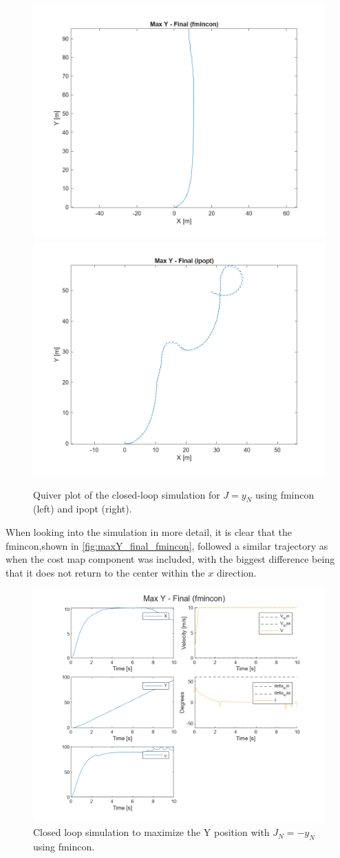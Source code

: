 \documentclass[]{IEEEtran}
\begin{document}
\begin{figure}[h]
    \centering
    \includegraphics[width = 0.49\columnwidth]{figs/Max_Y_-_Final_(fmincon)_quiver.png}
    \includegraphics[width = 0.49\columnwidth]{figs/Max_Y_-_Final_(ipopt)_quiver.png}
    \caption{Quiver plot of the closed-loop simulation for $J = y_N$ using fmincon (left) and ipopt (right).}\label{fig:maxY_final_quiver_comp}
\end{figure}

When looking into the simulation in more detail, it is clear that the fmincon,shown in \autoref{fig:maxY_final_fmincon}, followed a similar trajectory as when the cost map component was included, with the biggest difference being that it does not return to the center within the $x$ direction.

\begin{figure}[h]
    \centering
    \includegraphics[width = \columnwidth]{figs/Max_Y_-_Final_(fmincon)_traj.png}
    \caption{Closed loop simulation to maximize the Y position with $J_N = -y_N$ using fmincon.}\label{fig:maxY_final_fmincon}
\end{figure}
\end{document}
